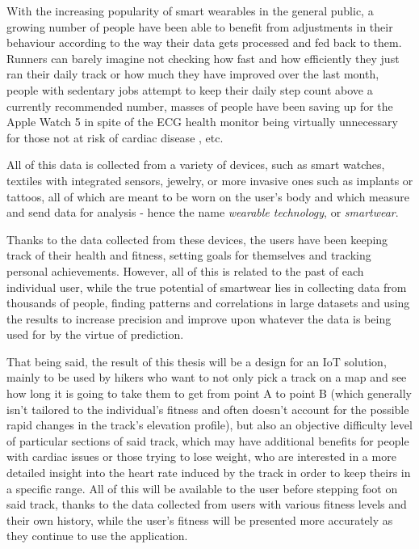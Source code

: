 \linebreak
With the increasing popularity of smart wearables in the general public, a growing number of people have been able to benefit from adjustments in their behaviour according to the way their data gets processed and fed back to them.
Runners can barely imagine not checking how fast and how efficiently they just ran their daily track or how much they have improved over the last month,
people with sedentary jobs attempt to keep their daily step count above a currently recommended number,
masses of people have been saving up for the Apple Watch 5 \cite{AppleWatch5} in spite of the ECG health monitor being virtually unnecessary for those not at risk of cardiac disease \cite{ecg-screening}, etc.

All of this data is collected from a variety of devices, such as smart watches, textiles with integrated sensors, jewelry, or more invasive ones such as implants or tattoos, all of which are meant to be worn on the user's body and which measure and send data for analysis - hence the name \textit{wearable technology}, or \textit{smartwear}. \cite{what-is-wearable-tech}

Thanks to the data collected from these devices, the users have been keeping track of their health and fitness, setting goals for themselves and tracking personal achievements.
However, all of this is related to the past of each individual user, while the true potential of smartwear lies in collecting data from thousands of people,
finding patterns and correlations in large datasets and using the results to increase precision and improve upon whatever the data is being used for by the virtue of prediction.

That being said, the result of this thesis will be a design for an IoT solution, mainly to be used by hikers who want to not only pick a track on a map and see how long it is going to take them to get from point A to point B (which generally isn't tailored to the individual's fitness and often doesn't account for the possible rapid changes in the track's elevation profile),
but also an objective difficulty level of particular sections of said track, which may have additional benefits for people with cardiac issues or those trying to lose weight, who are interested in a more detailed insight into the heart rate induced by the track in order to keep theirs in a specific range.
All of this will be available to the user before stepping foot on said track, thanks to the data collected from users with various fitness levels and their own history,
while the user's fitness will be presented more accurately as they continue to use the application.

